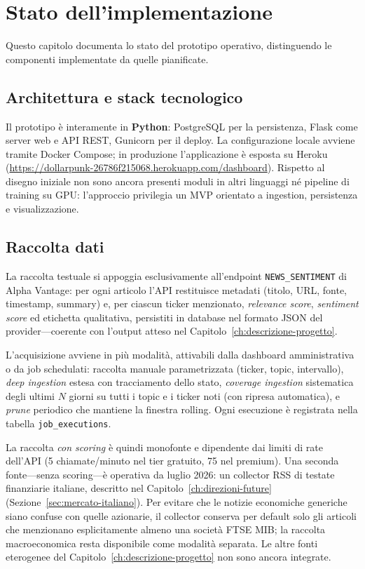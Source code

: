 \chapter{Stato dell'implementazione}
\label{ch:stato-implementazione}

Questo capitolo documenta lo stato del prototipo operativo, distinguendo le componenti implementate da quelle pianificate.

\section{Architettura e stack tecnologico}

Il prototipo è interamente in \textbf{Python}: PostgreSQL per la persistenza, Flask come server web e API REST, Gunicorn per il deploy.
La configurazione locale avviene tramite Docker Compose; in produzione l'applicazione è esposta su Heroku (\url{https://dollarpunk-26786f215068.herokuapp.com/dashboard}).
Rispetto al disegno iniziale non sono ancora presenti moduli in altri linguaggi né pipeline di training su GPU: l'approccio privilegia un MVP orientato a ingestion, persistenza e visualizzazione.

\section{Raccolta dati}

La raccolta testuale si appoggia esclusivamente all'endpoint \texttt{NEWS\_SENTIMENT} di Alpha Vantage: per ogni articolo l'API restituisce metadati (titolo, URL, fonte, timestamp, summary) e, per ciascun ticker menzionato, \emph{relevance score}, \emph{sentiment score} ed etichetta qualitativa, persistiti in database nel formato JSON del provider---coerente con l'output atteso nel Capitolo~\ref{ch:descrizione-progetto}.

L'acquisizione avviene in più modalità, attivabili dalla dashboard amministrativa o da job schedulati: raccolta manuale parametrizzata (ticker, topic, intervallo), \emph{deep ingestion} estesa con tracciamento dello stato, \emph{coverage ingestion} sistematica degli ultimi $N$ giorni su tutti i topic e i ticker noti (con ripresa automatica), e \emph{prune} periodico che mantiene la finestra rolling.
Ogni esecuzione è registrata nella tabella \texttt{job\_executions}.

La raccolta \emph{con scoring} è quindi monofonte e dipendente dai limiti di rate dell'API (5 chiamate/minuto nel tier gratuito, 75 nel premium).
Una seconda fonte---senza scoring---è operativa da luglio 2026: un collector RSS di testate finanziarie italiane, descritto nel Capitolo~\ref{ch:direzioni-future} (Sezione~\ref{sec:mercato-italiano}). Per evitare che le notizie economiche generiche siano confuse con quelle azionarie, il collector conserva per default solo gli articoli che menzionano esplicitamente almeno una società FTSE MIB; la raccolta macroeconomica resta disponibile come modalità separata. Le altre fonti eterogenee del Capitolo~\ref{ch:descrizione-progetto} non sono ancora integrate.

